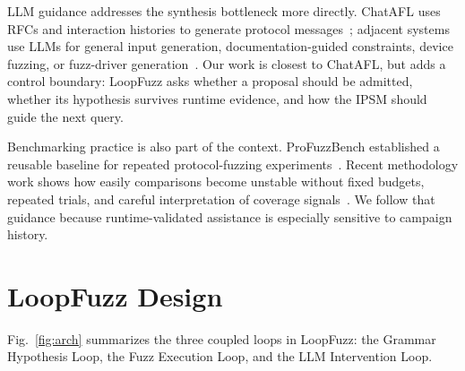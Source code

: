 \documentclass[final,5p,times,number]{elsarticle}
\begin{document}
LLM guidance addresses the synthesis bottleneck more directly. ChatAFL uses RFCs and interaction histories to generate protocol messages~\cite{chatafl}; adjacent systems use LLMs for general input generation, documentation-guided constraints, device fuzzing, or fuzz-driver generation~\cite{fuzz4all_universal_fuzzing_large_2024,llmif_augmented_large_language_2024,docter_documentation_guided_fuzzing_2022,carpetfuzz_documentation_2023,matter_llm_specification_2024,prompt_fuzzing_fuzz_driver_2024}. Our work is closest to ChatAFL, but adds a control boundary: LoopFuzz asks whether a proposal should be admitted, whether its hypothesis survives runtime evidence, and how the IPSM should guide the next query.

Benchmarking practice is also part of the context. ProFuzzBench established a reusable baseline for repeated protocol-fuzzing experiments~\cite{profuzzbench_benchmark_stateful_protocol_2021}. Recent methodology work shows how easily comparisons become unstable without fixed budgets, repeated trials, and careful interpretation of coverage signals~\cite{sok_prudent_evaluation_practices_2024,reliability_benchmarking_2022,many_stack_2022}. We follow that guidance because runtime-validated assistance is especially sensitive to campaign history.

\section{LoopFuzz Design}

Fig.~\ref{fig:arch} summarizes the three coupled loops in LoopFuzz: the Grammar Hypothesis Loop, the Fuzz Execution Loop, and the LLM Intervention Loop.
\end{document}
